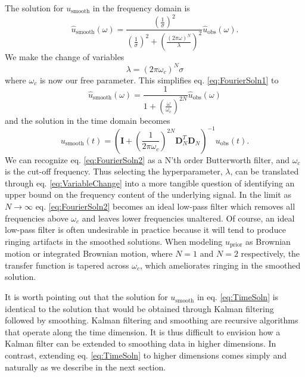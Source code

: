 \documentclass[10pt,a4paper]{article}
\begin{document}
The solution for $u_\mathrm{smooth}$ in the frequency domain is
\begin{equation}\label{eq:FourierSoln1}
\hat{u}_\mathrm{smooth}(\omega) = \frac{\left(\frac{1}{\sigma}\right)^2}
                                  {\left(\frac{1}{\sigma}\right)^2 + \left(\frac{(2\pi\omega)^N}{\lambda}\right)^2}
                                  \hat{u}_\mathrm{obs}(\omega).
\end{equation}
We make the change of variables
\begin{equation}\label{eq:VariableChange}
\lambda = (2\pi\omega_c)^N\sigma
\end{equation}
where $\omega_c$ is now our free parameter. This simplifies eq. \ref{eq:FourierSoln1} to
\begin{equation}\label{eq:FourierSoln2}
\hat{u}_\mathrm{smooth}(\omega) = \frac{1}
                                  {1 + \left(\frac{\omega}{\omega_c}\right)^{2N}}
                                  \hat{u}_\mathrm{obs}(\omega)                                  
\end{equation}
and the solution in the time domain becomes
\begin{equation}\label{eq:TimeSoln}
u_\mathrm{smooth}(t) = \left(\mathbf{I} + 
                          \left(\frac{1}{2\pi\omega_c}\right)^{2N}
                          \mathbf{D}_N^T\mathbf{D}_N\right)^{-1} u_\mathrm{obs}(t).
\end{equation}
We can recognize eq. \ref{eq:FourierSoln2} as a N'th order Butterworth filter, and $\omega_c$ is the cut-off frequency.  Thus selecting the hyperparameter, $\lambda$, can be translated through eq. \ref{eq:VariableChange} into a more tangible question of identifying an upper bound on the frequency content of the underlying signal. In the limit as $N\to \infty$ eq. \ref{eq:FourierSoln2} becomes an ideal low-pass filter which removes all frequencies above $\omega_c$ and leaves lower frequencies unaltered.  Of course, an ideal low-pass filter is often undesirable in practice because it will tend to produce ringing artifacts in the smoothed solutions.  When modeling $u_\mathrm{prior}$ as Brownian motion or integrated Brownian motion, where $N=1$ and $N=2$ respectively, the transfer function is tapered across $\omega_c$, which ameliorates ringing in the smoothed solution.

It is worth pointing out that the solution for $u_\mathrm{smooth}$ in eq. \ref{eq:TimeSoln} is identical to the solution that would be obtained through Kalman filtering followed by smoothing. Kalman filtering and smoothing are recursive algorithms that operate along the time dimension.  It is thus difficult to envision how a Kalman filter can be extended to smoothing data in higher dimensions.  In contrast, extending eq. \ref{eq:TimeSoln} to higher dimensions comes simply and naturally as we describe in the next section.     
\end{document}

